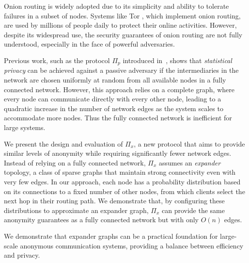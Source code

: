Onion routing is widely adopted due to its simplicity and ability to tolerate failures in a subset of nodes. Systems like Tor \cite{tor}, which implement onion routing, are used by millions of people daily to protect their online activities. However, despite its widespread use, the security guarantees of onion routing are not fully understood, especially in the face of powerful adversaries.

Previous work, such as the protocol $\Pi_p$ introduced in~\cite{ICALP:AndLysUpf18}, shows that \textit{statistical privacy} can be achieved against a passive adversary if the intermediaries in the network are chosen uniformly at random from all available nodes in a fully connected network. However, this approach relies on a complete graph, where every node can communicate directly with every other node, leading to a quadratic increase in the number of network edges as the system scales to accommodate more nodes. Thus the fully connected network is inefficient for large systems.

We present the design and evaluation of $\Pi_x$, a new protocol that aims to provide similar levels of anonymity while requiring significantly fewer network edges. Instead of relying on a fully connected network, $\Pi_x$ assumes an \textit{expander} topology, a class of sparse graphs that maintain strong connectivity even with very few edges. In our approach, each node has a probability distribution based on its connections to a fixed number of other nodes, from which clients select the next hop in their routing path. We demonstrate that, by configuring these distributions to approximate an expander graph, $\Pi_x$ can provide the same anonymity guarantees as a fully connected network but with only $O(n)$ edges.

We demonstrate that expander graphs can be a practical foundation for large-scale anonymous communication systems, providing a balance between efficiency and privacy.






